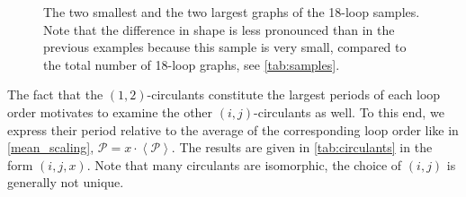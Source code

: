 \documentclass[11pt,a4paper]{article}
\newcommand{\period}{\mathcal P}
\renewcommand{\|}{\rule[-0.4ex]{0.2ex}{1.2em}}
\begin{document}
\begin{figure}[htb]
	\caption{The two smallest and the two largest graphs of the 18-loop samples. Note that the difference in shape is less pronounced than in the previous examples because this sample is very small, compared to the total number of 18-loop graphs, see \cref{tab:samples}.}
	\label{smallest_18}
\end{figure}



The fact that the $(1,2)$-circulants constitute the largest periods of each loop order motivates to examine the other $(i,j)$-circulants as well. To this end, we express their period relative to the average of the corresponding loop order like in \cref{mean_scaling}, $\period = x \cdot \left \langle \period \right \rangle $. The results are given in \cref{tab:circulants} in the form $(i,j,x)$. Note that many circulants are isomorphic, the choice of $(i,j)$ is generally not unique. 
\end{document}
